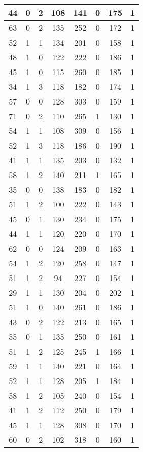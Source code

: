 \documentclass{article}
\begin{document}
\begin{longtable}{|c|c|c|c|c|c|c|c|}
44 & 0 & 2 & 108 & 141 & 0 & 175 & 1 \\ \hline
63 & 0 & 2 & 135 & 252 & 0 & 172 & 1 \\ \hline
52 & 1 & 1 & 134 & 201 & 0 & 158 & 1 \\ \hline
48 & 1 & 0 & 122 & 222 & 0 & 186 & 1 \\ \hline
45 & 1 & 0 & 115 & 260 & 0 & 185 & 1 \\ \hline
34 & 1 & 3 & 118 & 182 & 0 & 174 & 1 \\ \hline
57 & 0 & 0 & 128 & 303 & 0 & 159 & 1 \\ \hline
71 & 0 & 2 & 110 & 265 & 1 & 130 & 1 \\ \hline
54 & 1 & 1 & 108 & 309 & 0 & 156 & 1 \\ \hline
52 & 1 & 3 & 118 & 186 & 0 & 190 & 1 \\ \hline
41 & 1 & 1 & 135 & 203 & 0 & 132 & 1 \\ \hline
58 & 1 & 2 & 140 & 211 & 1 & 165 & 1 \\ \hline
35 & 0 & 0 & 138 & 183 & 0 & 182 & 1 \\ \hline
51 & 1 & 2 & 100 & 222 & 0 & 143 & 1 \\ \hline
45 & 0 & 1 & 130 & 234 & 0 & 175 & 1 \\ \hline
44 & 1 & 1 & 120 & 220 & 0 & 170 & 1 \\ \hline
62 & 0 & 0 & 124 & 209 & 0 & 163 & 1 \\ \hline
54 & 1 & 2 & 120 & 258 & 0 & 147 & 1 \\ \hline
51 & 1 & 2 & 94 & 227 & 0 & 154 & 1 \\ \hline
29 & 1 & 1 & 130 & 204 & 0 & 202 & 1 \\ \hline
51 & 1 & 0 & 140 & 261 & 0 & 186 & 1 \\ \hline
43 & 0 & 2 & 122 & 213 & 0 & 165 & 1 \\ \hline
55 & 0 & 1 & 135 & 250 & 0 & 161 & 1 \\ \hline
51 & 1 & 2 & 125 & 245 & 1 & 166 & 1 \\ \hline
59 & 1 & 1 & 140 & 221 & 0 & 164 & 1 \\ \hline
52 & 1 & 1 & 128 & 205 & 1 & 184 & 1 \\ \hline
58 & 1 & 2 & 105 & 240 & 0 & 154 & 1 \\ \hline
41 & 1 & 2 & 112 & 250 & 0 & 179 & 1 \\ \hline
45 & 1 & 1 & 128 & 308 & 0 & 170 & 1 \\ \hline
60 & 0 & 2 & 102 & 318 & 0 & 160 & 1 \\ \hline

\end{longtable}
\end{document}

